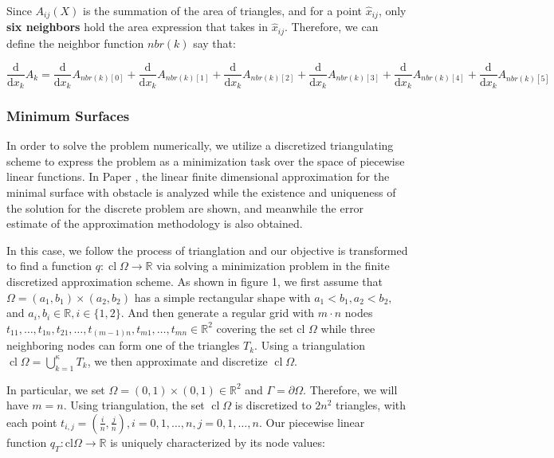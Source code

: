 Since $A_{ij}(X)$ is the summation of the area of triangles, and for a point $\hat{x}_{ij}$, only \textbf{six neighbors} hold the area expression that takes in $\hat{x}_{ij}$. Therefore, we can define the neighbor function $nbr(k)$ say that:

\begin{equation}
    \frac{\mathrm{d}}{\mathrm{d}x_k}A_k = \frac{\mathrm{d}}{\mathrm{d}x_k}A_{nbr(k)[0]} + \frac{\mathrm{d}}{\mathrm{d}x_k}A_{nbr(k)[1]} + \frac{\mathrm{d}}{\mathrm{d}x_k}A_{nbr(k)[2]} + \frac{\mathrm{d}}{\mathrm{d}x_k}A_{nbr(k)[3]} + \frac{\mathrm{d}}{\mathrm{d}x_k}A_{nbr(k)[4]} + \frac{\mathrm{d}}{\mathrm{d}x_k}A_{nbr(k)[5]} 
\end{equation}

\subsubsection{Minimum Surfaces}
In order to solve the problem numerically, we utilize a discretized triangulating scheme to express the problem as a minimization task over the space of piecewise linear functions. In Paper \cite{shen1992finite}, the linear finite dimensional approximation for the minimal surface with obstacle is analyzed while the existence and uniqueness of the solution for the discrete problem are shown, and meanwhile the error estimate of the approximation methodology is also obtained. 

In this case, we follow the process of trianglation and our objective is transformed to find a function  $q: \operatorname{cl} \Omega \rightarrow \mathbb{R}$ via solving a minimization problem in the finite discretized approximation scheme. As shown in figure 1, we first assume that $\Omega=\left(a_{1}, b_{1}\right) \times\left(a_{2}, b_{2}\right)$ has a simple rectangular shape with $a_{1}<b_{1}, a_{2}<b_{2},$ and $a_{i}, b_{i} \in \mathbb{R}, i \in\{1,2\} .$ And then generate a regular grid with $m \cdot n$ nodes $t_{11}, \ldots, t_{1 n}, t_{21}, \ldots, t_{(m-1) n}, t_{m 1}, \ldots, t_{m n} \in \mathbb{R}^{2}$
covering the set cl $\Omega$ while three neighboring nodes can form one of the triangles $T_{k} .$ Using a triangulation $\operatorname{cl} \Omega=\bigcup_{k=1}^{\kappa} T_{k}$, we then approximate and discretize $\operatorname{cl} \Omega$.



In particular, we set $\Omega=(0,1) \times(0,1) \in \mathbb R^{2}$ and $\Gamma=\partial \Omega$. Therefore, we will have $m=n$. Using triangulation, the set $\operatorname{cl} \Omega$ is discretized to $2 n^{2}$ triangles, with each point $t_{i, j}=\left(\frac{i}{n}, \frac{j}{n}\right), i=0,1, \ldots, n, j=0,1, \ldots, n .$ Our piecewise linear function $q_{T}: \mathrm{cl} \Omega \rightarrow \mathbb{R}$ is uniquely characterized by its node values:

